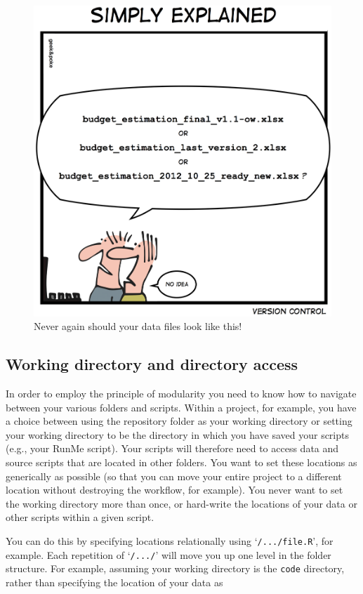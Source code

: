 \documentclass[12pt,letterpaper]{article}
\begin{document}
\begin{figure}
	\centering
	\includegraphics[width=0.8\linewidth]{datafilenames.jpg}
	\caption{Never again should your data files look like this!}
	\label{fig:datafilenames}
\end{figure}

\subsection{Working directory and directory access}
In order to employ the principle of modularity you need to know how to navigate between your various folders and scripts.  Within a project, for example, you have a choice between using the repository folder as your working directory or setting your working directory to be the directory in which you have saved your scripts (e.g., your RunMe script). Your scripts will therefore need to access data and source scripts that are located in other folders.  You want to set these locations as generically as possible (so that you can move your entire project to a different location without destroying the workflow, for example).  You never want to set the working directory more than once, or hard-write the locations of your data or other scripts within a given script.

You can do this by specifying locations relationally using `\texttt{/.../file.R}', for example. Each repetition of `\texttt{/.../}' will move you up one level in the folder structure.   For example, assuming your working directory is the \texttt{code} directory, rather than specifying the location of your data as
\end{document}
